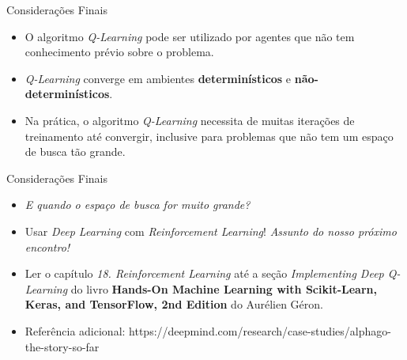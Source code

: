 \documentclass{beamer}
\begin{document}



\begin{frame}{Considerações Finais}
\begin{itemize}
	\item O algoritmo \textit{Q-Learning} pode ser utilizado por agentes que 
	não tem conhecimento prévio sobre o problema.
	
	
	
	\item \textit{Q-Learning} converge em ambientes 
	\textbf{determinísticos} e \textbf{não-determinísticos}.
	
	\item Na prática, o algoritmo \textit{Q-Learning} necessita de muitas iterações de 
	treinamento até convergir, inclusive para problemas que não tem um espaço de busca 
	tão grande.   

\end{itemize}
\end{frame}


\begin{frame}{Considerações Finais}
	\begin{itemize}
	\item \emph{E quando o espaço de busca for muito grande?} 

	\item Usar \textit{Deep Learning} com \textit{Reinforcement Learning}! \emph{Assunto do 
	nosso próximo encontro!}

	\item Ler o capítulo \textit{18. Reinforcement Learning} até a seção 
	\textit{Implementing Deep Q-Learning} do livro \textbf{Hands-On Machine Learning 
	with Scikit-Learn, Keras, and TensorFlow, 2nd Edition} do Aurélien Géron.

	\item Referência adicional: https://deepmind.com/research/case-studies/alphago-the-story-so-far

\end{itemize}
\end{frame}
\end{document}
